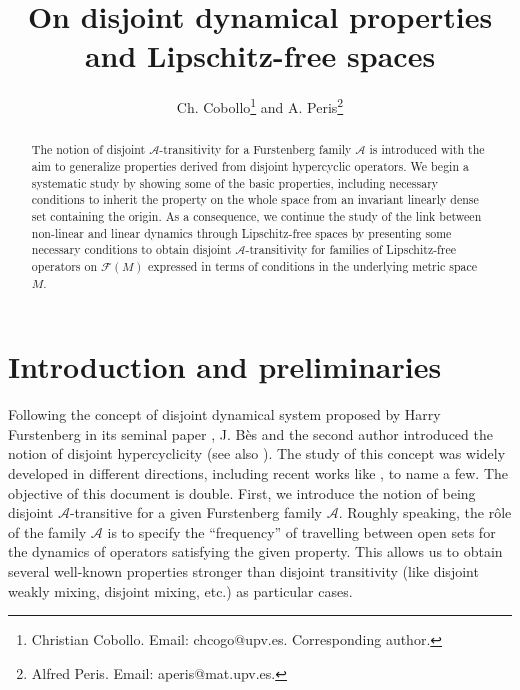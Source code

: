 \documentclass[11pt,reqno]{article}
\title{On disjoint dynamical properties and Lipschitz-free spaces}
\author{Ch. Cobollo\footnote{Christian Cobollo. %
Email: chcogo@upv.es. Corresponding author.
}
and A. Peris\footnote{Alfred Peris. %
Email: aperis@mat.upv.es.
}
}
\affil{\textit{Institut Universitari de Matem\`atica Pura i Aplicada. Universitat Polit\`ecnica de Val\`encia (Spain).}}
\date{}
\newcommand{\free}[1]{\mathcal{F}(#1)} %
\begin{document}
\maketitle
\begin{abstract}
The notion of disjoint $\mathcal{A}$-transitivity for a Furstenberg family $\mathcal{A}$ is introduced with the aim to generalize properties derived from disjoint hypercyclic operators. We begin a systematic study by showing some of the basic properties, including necessary conditions to inherit the property on the whole space from 
an invariant linearly dense set containing the origin. As a consequence, we continue the study of the link between non-linear and linear dynamics through Lipschitz-free spaces by presenting some necessary conditions to obtain disjoint $\mathcal{A}$-transitivity for families of Lipschitz-free operators on $\free{M}$ expressed in terms of conditions in the underlying metric space $M$.
\end{abstract}



\section{Introduction and preliminaries}

Following the concept of disjoint dynamical system proposed by Harry Furstenberg in its seminal paper \cite{Furst67}, J. B\`es and the second author introduced the notion of disjoint hypercyclicity \cite{BesPeris07} (see also \cite{Ber-Gon07}). The study of this concept was widely developed in different directions, including recent works like \cite{BMPS12,SanShk14,Bay23,MaMePu22}, to name a few. The objective of this document is double. First, we introduce the notion of being disjoint $\mathcal{A}$-transitive for a given Furstenberg family $\mathcal{A}$.  Roughly speaking, the rôle of the family $\mathcal{A}$ is to specify the ``frequency'' of travelling between open sets for the dynamics of operators satisfying the given property. This allows us to obtain several well-known properties stronger than disjoint transitivity (like disjoint weakly mixing, disjoint mixing, etc.) as particular cases. 
\end{document}
